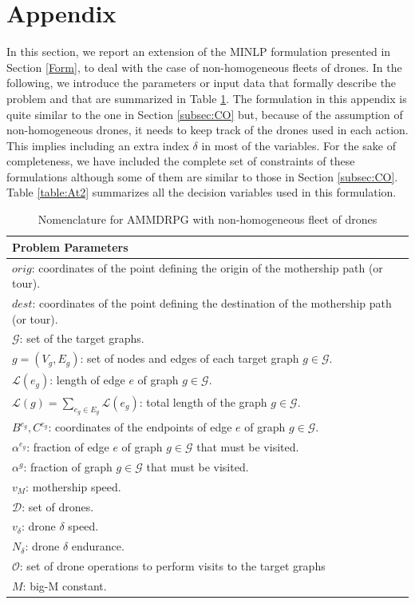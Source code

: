 \documentclass[10pt,a4paper]{elsarticle}
\newcommand{\EN}[1]{{\color{black}#1}}
\begin{document}




\section{Appendix}\label{App}
\noindent
In this section, we report an extension of the MINLP formulation presented in Section \ref{Form}, \EN{to deal} with the case of non\EN{-}homogeneous fleets of drones.
\noindent
In the following, we introduce the parameters or input data that formally describe the problem and that are summarized in Table \ref{table:At1}.
\noindent
The formulation in this appendix is \EN{quite} similar to the one in Section \ref{subsec:CO} but, because of the assumption of non\EN{-}homogeneous drones, it needs to keep track of the drones used in each action. This implies \EN{including} an extra index $\delta$ in most of the variables. For the sake of completeness, we have included the complete set of constraints of \EN{these} formulations although some of them are similar to those in Section \ref{subsec:CO}. Table \ref{table:At2} summarizes all the decision variables used in this formulation.

\begin{table}[!h]
	\scriptsize
	\centering
	\begin{tabular}{ | l | }
		\hline
		\textbf{Problem Parameters}\\
		\hline
		$orig$: coordinates of the point defining the origin of the mothership path (or tour).\\
		$dest$: coordinates of the point defining the destination of the mothership path (or tour).\\
		$\mathcal{G}$: set of the target graphs.\\
		$g = (V_g, E_g)$: set of nodes and edges of each target graph $g \in \mathcal{G}$.\\
		$\mathcal{L}(e_g)$: length of edge $e$ of graph $g \in \mathcal{G}$.\\
		$\mathcal{L}(g)=\sum_{e_g\in E_g} \mathcal L(e_g)$: total length of the graph $g\in\mathcal G$.\\
		$B^{e_g}, C^{e_g}$: coordinates of the endpoints of edge $e$ of graph $g \in \mathcal{G}$.\\
		$\alpha^{e_g}$: fraction of edge $e$ of graph $g \in \mathcal{G}$ that must be visited.\\
		$\alpha^{g}$: fraction of graph $g \in \mathcal{G}$ that must be visited.\\
		$v_M$: mothership speed.\\
		$\mathcal D$: set of drones.\\
		$v_\delta$: drone $\delta$ speed.\\
		$N_\delta$: drone $\delta$ endurance. \\
		$\mathcal{O}$: set of drone operations to perform visits to the target graphs\\
		$M$: big-M constant.\\
		\hline
	\end{tabular}
	\caption{Nomenclature for AMMDRPG with non-homogeneous fleet of drones}
	\label{table:At1}
\end{table}
\end{document}
